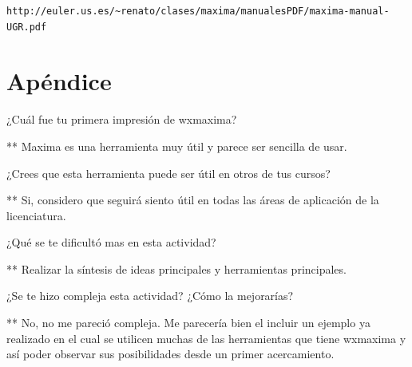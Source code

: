 \documentclass{article} %
\begin{document}
\begin{verbatim} 
http://euler.us.es/~renato/clases/maxima/manualesPDF/maxima-manual-UGR.pdf
\end{verbatim}



\section*{Apéndice}

\hspace{0.5 cm} ¿Cuál fue tu primera impresión de wxmaxima?

\vspace{0.5 cm}

** Maxima es una herramienta muy útil y parece ser sencilla de usar.

\vspace{0.5 cm}

¿Crees que esta herramienta puede ser útil en otros de tus cursos?

\vspace{0.5 cm}

** Si, considero que seguirá siento útil en todas las áreas de aplicación de la licenciatura.

\vspace{0.5 cm}
 
 ¿Qué se te dificultó mas en esta actividad?
 
\vspace{0.5 cm}

** Realizar la síntesis de ideas principales y herramientas principales.

\vspace{0.5 cm}

¿Se te hizo compleja esta actividad? ¿Cómo la mejorarías? 

\vspace{0.5 cm}

** No, no me pareció compleja. Me parecería bien el incluir un ejemplo ya realizado en el cual se utilicen muchas de las herramientas que tiene wxmaxima y así poder observar sus posibilidades desde un primer acercamiento. 
\end{document}
